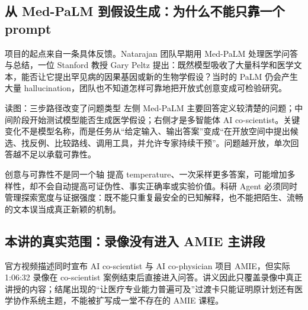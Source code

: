 
\subsection{从 Med-PaLM 到假设生成：为什么不能只靠一个 prompt}

项目的起点来自一条具体反馈。Natarajan 团队早期用 Med-PaLM 处理医学问答与总结，一位 Stanford 教授 Gary Peltz 提出：既然模型吸收了大量科学和医学文本，能否让它提出罕见病的因果基因或新的生物学假设？当时的 PaLM 仍会产生大量 hallucination，团队也不知道怎样可靠地把开放式创意变成可检验研究。


\begin{knowledgebox}{读图：三步路径改变了问题类型}
左侧 Med-PaLM 主要回答定义较清楚的问题；中间阶段开始测试模型能否生成医学假设；右侧才是多智能体 AI co-scientist。关键变化不是模型名称，而是任务从“给定输入、输出答案”变成“在开放空间中提出候选、找反例、比较路线、调用工具，并允许专家持续干预”。问题越开放，单次回答越不足以承载可靠性。
\end{knowledgebox}


\begin{warningbox}{创意与可靠性不是同一个轴}
提高 temperature、一次采样更多答案，可能增加多样性，却不会自动提高可证伪性、事实正确率或实验价值。科研 Agent 必须同时管理探索宽度与证据强度：既不能只重复最安全的已知解释，也不能把陌生、流畅的文本误当成真正新颖的机制。
\end{warningbox}

\subsection{本讲的真实范围：录像没有进入 AMIE 主讲段}

官方视频描述同时宣布 AI co-scientist 与 AI co-physician 项目 AMIE，但实际 1:06:32 录像在 co-scientist 案例结束后直接进入问答。讲义因此只覆盖录像中真正讲授的内容；结尾出现的“让医疗专业能力普遍可及”过渡卡只能证明原计划还有医学协作系统主题，不能被扩写成一堂不存在的 AMIE 课程。

